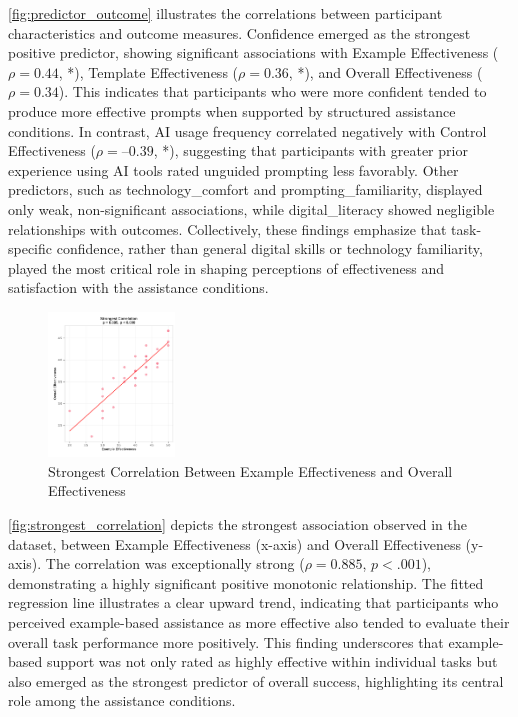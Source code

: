 \autoref{fig:predictor_outcome} illustrates the correlations between participant characteristics and outcome measures. Confidence emerged as the strongest positive predictor, showing significant associations with Example Effectiveness ($\rho = 0.44$, *), Template Effectiveness ($\rho = 0.36$, *), and Overall Effectiveness ($\rho = 0.34$). This indicates that participants who were more confident tended to produce more effective prompts when supported by structured assistance conditions. In contrast, AI usage frequency correlated negatively with Control Effectiveness ($\rho = –0.39$, *), suggesting that participants with greater prior experience using AI tools rated unguided prompting less favorably. Other predictors, such as technology\_comfort and prompting\_familiarity, displayed only weak, non-significant associations, while digital\_literacy showed negligible relationships with outcomes. Collectively, these findings emphasize that task-specific confidence, rather than general digital skills or technology familiarity, played the most critical role in shaping perceptions of effectiveness and satisfaction with the assistance conditions.


\begin{figure}[h]
\centering
\includegraphics[width=0.3\textwidth]{figures/11.png}
\caption{Strongest Correlation Between Example Effectiveness and Overall Effectiveness}
\label{fig:strongest_correlation}
\end{figure}

\autoref{fig:strongest_correlation} depicts the strongest association observed in the dataset, between Example Effectiveness (x-axis) and Overall Effectiveness (y-axis). The correlation was exceptionally strong ($\rho = 0.885$, $p < .001$), demonstrating a highly significant positive monotonic relationship. The fitted regression line illustrates a clear upward trend, indicating that participants who perceived example-based assistance as more effective also tended to evaluate their overall task performance more positively. This finding underscores that example-based support was not only rated as highly effective within individual tasks but also emerged as the strongest predictor of overall success, highlighting its central role among the assistance conditions.


